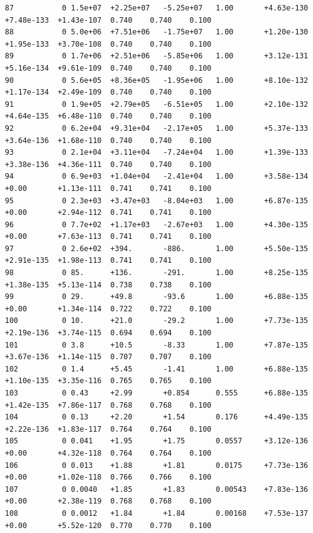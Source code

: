 \documentclass[12pt]{article}
\numberwithin{equation}{section}
\begin{document}
\begin{lstlisting}
87           0 1.5e+07  +2.25e+07   -5.25e+07   1.00       +4.63e-130  +7.48e-133  +1.43e-107  0.740    0.740    0.100
88           0 5.0e+06  +7.51e+06   -1.75e+07   1.00       +1.20e-130  +1.95e-133  +3.70e-108  0.740    0.740    0.100
89           0 1.7e+06  +2.51e+06   -5.85e+06   1.00       +3.12e-131  +5.16e-134  +9.61e-109  0.740    0.740    0.100
90           0 5.6e+05  +8.36e+05   -1.95e+06   1.00       +8.10e-132  +1.17e-134  +2.49e-109  0.740    0.740    0.100
91           0 1.9e+05  +2.79e+05   -6.51e+05   1.00       +2.10e-132  +4.64e-135  +6.48e-110  0.740    0.740    0.100
92           0 6.2e+04  +9.31e+04   -2.17e+05   1.00       +5.37e-133  +3.64e-136  +1.68e-110  0.740    0.740    0.100
93           0 2.1e+04  +3.11e+04   -7.24e+04   1.00       +1.39e-133  +3.38e-136  +4.36e-111  0.740    0.740    0.100
94           0 6.9e+03  +1.04e+04   -2.41e+04   1.00       +3.58e-134  +0.00       +1.13e-111  0.741    0.741    0.100
95           0 2.3e+03  +3.47e+03   -8.04e+03   1.00       +6.87e-135  +0.00       +2.94e-112  0.741    0.741    0.100
96           0 7.7e+02  +1.17e+03   -2.67e+03   1.00       +4.30e-135  +0.00       +7.63e-113  0.741    0.741    0.100
97           0 2.6e+02  +394.       -886.       1.00       +5.50e-135  +2.91e-135  +1.98e-113  0.741    0.741    0.100
98           0 85.      +136.       -291.       1.00       +8.25e-135  +1.38e-135  +5.13e-114  0.738    0.738    0.100
99           0 29.      +49.8       -93.6       1.00       +6.88e-135  +0.00       +1.34e-114  0.722    0.722    0.100
100          0 10.      +21.0       -29.2       1.00       +7.73e-135  +2.19e-136  +3.74e-115  0.694    0.694    0.100
101          0 3.8      +10.5       -8.33       1.00       +7.87e-135  +3.67e-136  +1.14e-115  0.707    0.707    0.100
102          0 1.4      +5.45       -1.41       1.00       +6.88e-135  +1.10e-135  +3.35e-116  0.765    0.765    0.100
103          0 0.43     +2.99       +0.854      0.555      +6.88e-135  +1.42e-135  +7.86e-117  0.768    0.768    0.100
104          0 0.13     +2.20       +1.54       0.176      +4.49e-135  +2.22e-136  +1.83e-117  0.764    0.764    0.100
105          0 0.041    +1.95       +1.75       0.0557     +3.12e-136  +0.00       +4.32e-118  0.764    0.764    0.100
106          0 0.013    +1.88       +1.81       0.0175     +7.73e-136  +0.00       +1.02e-118  0.766    0.766    0.100
107          0 0.0040   +1.85       +1.83       0.00543    +7.83e-136  +0.00       +2.38e-119  0.768    0.768    0.100
108          0 0.0012   +1.84       +1.84       0.00168    +7.53e-137  +0.00       +5.52e-120  0.770    0.770    0.100

\end{lstlisting}
\end{document}
